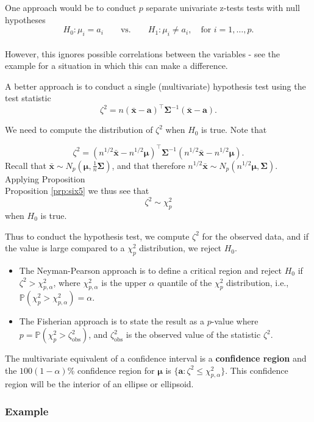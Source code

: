 \documentclass[
]{book}
\theoremstyle{definition}
\theoremstyle{definition}
\theoremstyle{definition}
\theoremstyle{definition}
\theoremstyle{remark}
\begin{document}
One approach would be to conduct \(p\) separate univariate z-tests tests with null hypotheses
\[H_0: \mu_i = a_i \qquad \text{vs.} \qquad H_1: \mu_i \neq a_i, \quad \mbox{for } i=1,\ldots,p.\]\\
However, this ignores possible correlations between the variables - see the example for a situation in which this can make a difference.

A better approach is to conduct a single (multivariate) hypothesis test using the test statistic
\[
\zeta^2 = n(\bar{\mathbf x}-\mathbf a)^\top \boldsymbol{\Sigma}^{-1} (\bar{\mathbf x}-\mathbf a).
\]

We need to compute the distribution of \(\zeta^2\) when \(H_0\) is true. Note that

\[
\zeta^2 = (n^{1/2}\bar{\mathbf x}-n^{1/2}{\boldsymbol{\mu}})^\top \boldsymbol{\Sigma}^{-1} (n^{1/2}\bar{\mathbf x}-n^{1/2}{\boldsymbol{\mu}}).
\]
Recall that \(\bar{\mathbf x} \sim N_p({\boldsymbol{\mu}}, \frac{1}{n} \boldsymbol{\Sigma})\), and that therefore \(n^{1/2} \bar{\mathbf x} \sim N_p(n^{1/2} {\boldsymbol{\mu}}, \boldsymbol{\Sigma})\). Applying Proposition\\
Proposition \ref{prp:six5} we thus see that
\[\zeta^2\sim \chi_p^2\]
when \(H_0\) is true.

Thus to conduct the hypothesis test, we compute \(\zeta^2\) for the observed data, and if the value is large compared to a \(\chi^2_p\) distribution, we reject \(H_0\).

\begin{itemize}
\item
  The Neyman-Pearson approach is to define a critical region and reject \(H_0\) if \(\zeta^2 > \chi^2_{p,\alpha}\), where \(\chi^2_{p,\alpha}\) is the upper \(\alpha\) quantile of the \(\chi^2_p\) distribution, i.e., \(\mathbb{P}(\chi^2_p > \chi^2_{p,\alpha})=\alpha\).
\item
  The Fisherian approach is to state the result as a \(p\)-value where \(p = \mathbb{P}(\chi^2_p > \zeta_{\text{obs}}^2)\), and
  \(\zeta_{\text{obs}}^2\) is the observed value of the statistic \(\zeta^2\).
\end{itemize}

The multivariate equivalent of a confidence interval is a \textbf{confidence region} and the \(100(1-\alpha)\)\% confidence region for \({\boldsymbol{\mu}}\) is \(\{ \mathbf a: \zeta^2 \leq \chi^2_{p,\alpha} \}\).
This confidence region will be the interior of an ellipse or ellipsoid.

\subsubsection*{Example}\label{example-6}
\end{document}
